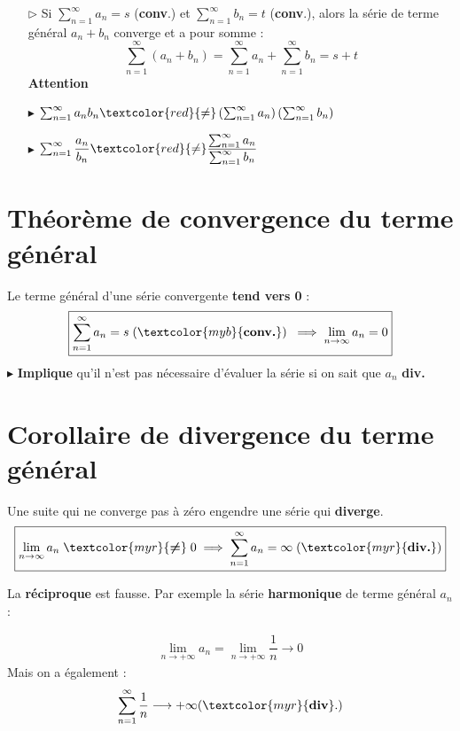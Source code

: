 \documentclass{report}
\begin{document}
\begin{multicols*}{3}
\begin{itemize}
        \item[$\rhd$] Si \(\sum_{n=1}^{\infty} a_n = s\) (\textcolor{myb}{\textbf{conv}}.) et 
            \(\sum_{n=1}^{\infty} b_n = t\) (\textcolor{myb}{\textbf{conv}}.), 
            alors la série de terme général \(a_n + b_n\) 
            converge et a pour somme : 
        \[
        \sum_{n=1}^{\infty} (a_n + b_n) = \sum_{n=1}^{\infty } a_n + \sum_{n=1}^{\infty } b_n = s + t
        \]
        \textcolor{myr}{\textbf{Attention}} 
        \item[$\blacktriangleright$] 
            $\sum_{n=1}^{\infty }a_nb_n \textcolor{red}{\neq} 
            \left(\sum_{n=1}^{\infty }a_n\right) \left(\sum_{n=1}^{\infty}b_n\right)$
        \item[$\blacktriangleright$]
            $\sum_{n=1}^{\infty }\dfrac{a_n}{b_n} 
            \textcolor{red}{\neq} 
            \dfrac{\sum_{n=1}^{\infty }a_n}{\sum_{n=1}^{\infty }b_n}$
    \end{itemize}

    \section{Théorème de convergence du terme général}
        Le terme général d'une série convergente \textbf{tend vers 0} : 
        $$%
        \boxed{\sum_{n=1}^{\infty }a_n = s \; (\textcolor{myb}{\textbf{conv.}}) 
        \;\implies \lim\limits_{n\to \infty} a_n = 0}
        $$%
        $\blacktriangleright$ \textbf{Implique} qu'il n'est pas 
        nécessaire d'évaluer la série si on sait que 
        $a_n$ \textcolor{myr}{\textbf{div.}} 

    \section{Corollaire de divergence du terme général}
    \vspace{-1em}%
        Une suite qui ne converge pas à zéro engendre une série qui \textbf{diverge}.        
        \[%
        \boxed{
        \lim\limits_{n\to \infty} a_n \; \textcolor{myr}{\boldsymbol{\neq}} \; 0 \implies   
        \sum_{n=1}^{\infty }a_n = \infty \; (\textcolor{myr}{\textbf{div.}})}
        \]%
    \vspace{-1em}
    \begin{note}{}{}
        La \textbf{réciproque } est fausse. Par exemple la série 
        \textbf{harmonique} de terme général $a_n$  : 

        \begin{align*}
            \lim\limits_{n \to+\infty }a_n = 
            \lim\limits_{n \to+\infty } \dfrac{1}{n} 
            \longrightarrow 0
        \end{align*}
        Mais on a également  : 
        \begin{align*}
            \sum_{n=1}^{\infty }\dfrac{1}{n} \longrightarrow 
            + \infty (\textcolor{myr}{\textbf{div}}.  )
        \end{align*}
    \end{note}


\end{multicols*}
\end{document}
